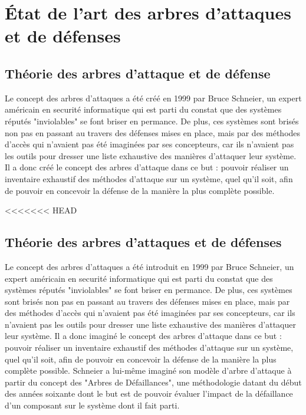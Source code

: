 \section{\'Etat de l'art des arbres d'attaques et de défenses}

    \subsection{Théorie des arbres d'attaque et de défense}
        Le concept des arbres d'attaques a été créé en 1999 par Bruce Schneier, un expert américain en securité informatique qui est parti du constat que des systèmes réputés "inviolables" se font briser en permance. De plus, ces systèmes sont brisés non pas en passant au travers des défenses mises en place, mais par des méthodes d'accès qui n'avaient pas été imaginées par ses concepteurs, car ils n'avaient pas les outils pour dresser une liste exhaustive des manières d'attaquer leur système. Il a donc créé le concept des arbres d'attaque dans ce but : pouvoir réaliser un inventaire exhaustif des méthodes d'attaque sur un système, quel qu'il soit, afin de pouvoir en concevoir la défense de la manière la plus complète possible.

<<<<<<< HEAD
	\subsection{Théorie des arbres d'attaques et de défenses}
		Le concept des arbres d'attaques a été introduit en 1999 par Bruce Schneier, un expert américain en securité informatique qui est parti du constat que des systèmes réputés "inviolables" se font briser en permance. De plus, ces systèmes sont brisés non pas en passant au travers des défenses mises en place, mais par des méthodes d'accès qui n'avaient pas été imaginées par ses concepteurs, car ils n'avaient pas les outils pour dresser une liste exhaustive des manières d'attaquer leur système. Il a donc imaginé le concept des arbres d'attaque dans ce but : pouvoir réaliser un inventaire exhaustif des méthodes d'attaque sur un système, quel qu'il soit, afin de pouvoir en concevoir la défense de la manière la plus complète possible. Schneier a lui-même imaginé son modèle d'arbre d'attaque à partir du concept des "Arbres de Défaillances", une méthodologie datant du début des années soixante dont le but est de pouvoir évaluer l'impact de la défaillance d'un composant sur le système dont il fait parti. 

